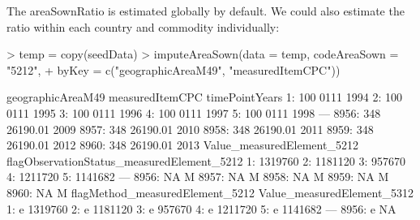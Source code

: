 \documentclass[nojss]{jss}
\begin{document}
The areaSownRatio is estimated globally by default.  We could also estimate the
ratio within each country and commodity individually:

\begin{Schunk}
\begin{Sinput}
> temp = copy(seedData)
> imputeAreaSown(data = temp, codeAreaSown = "5212",
+                byKey = c("geographicAreaM49", "measuredItemCPC"))
\end{Sinput}
\begin{Soutput}
      geographicAreaM49 measuredItemCPC timePointYears
   1:               100            0111           1994
   2:               100            0111           1995
   3:               100            0111           1996
   4:               100            0111           1997
   5:               100            0111           1998
  ---                                                 
8956:               348        26190.01           2009
8957:               348        26190.01           2010
8958:               348        26190.01           2011
8959:               348        26190.01           2012
8960:               348        26190.01           2013
      Value_measuredElement_5212 flagObservationStatus_measuredElement_5212
   1:                    1319760                                           
   2:                    1181120                                           
   3:                     957670                                           
   4:                    1211720                                           
   5:                    1141682                                           
  ---                                                                      
8956:                         NA                                          M
8957:                         NA                                          M
8958:                         NA                                          M
8959:                         NA                                          M
8960:                         NA                                          M
      flagMethod_measuredElement_5212 Value_measuredElement_5312
   1:                               e                    1319760
   2:                               e                    1181120
   3:                               e                     957670
   4:                               e                    1211720
   5:                               e                    1141682
  ---                                                           
8956:                               e                         NA

\end{Soutput}
\end{Schunk}
\end{document}
